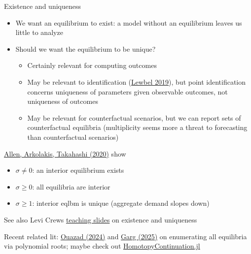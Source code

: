 \documentclass[10pt,notes=hide,aspectratio=169]{beamer}
\begin{document}
\begin{frame}{Existence and uniqueness}
\begin{itemize}
\item We want an equilibrium to exist:
a model without an equilibrium leaves us little to analyze
\item Should we want the equilibrium to be unique?
\begin{itemize}
\item Certainly relevant for computing outcomes
\item May be relevant to identification (\href{https://www.aeaweb.org/articles?id=10.1257/jel.20181361}{Lewbel 2019}),
but point identification concerns uniqueness of parameters given observable outcomes,
not uniqueness of outcomes
\item May be relevant for counterfactual scenarios,
but we can report sets of counterfactual equilibria
(multiplicity seems more a threat to forecasting than counterfactual scenarios)
\end{itemize}
\end{itemize}
\href{https://doi.org/10.1086/704385}{Allen, Arkolakis, Takahashi (2020)} show
\begin{itemize}
\item $\sigma \neq 0$: an interior equilibrium exists
\item $\sigma \geq 0$: all equilibria are interior
\item $\sigma \geq 1$: interior eqlbm is unique (aggregate demand slopes down)
\end{itemize}
See also Levi Crews \href{https://www.levicrews.com/files/slides-allenarkolakis.pdf}{teaching slides} on existence and uniqueness \\
\vspace{2mm}
{\small Recent related lit:
\href{https://dx.doi.org/10.2139/ssrn.4699361}{Ouazad (2024)} and
\href{https://economics.mit.edu/people/phd-students/tishara-garg}{Garg (2025)}
on enumerating all equilibria via polynomial roots;
maybe check out \href{https://www.juliahomotopycontinuation.org/}{HomotopyContinuation.jl}\par}
\end{frame}
\end{document}
